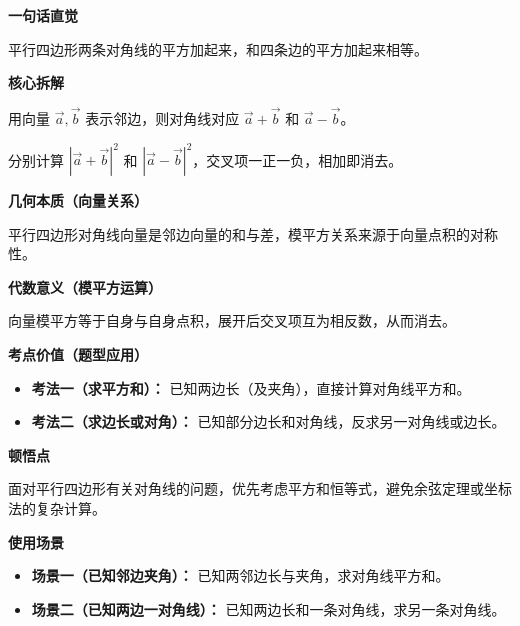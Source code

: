 \begin{explanationbox}
	\textbf{\textcolor{CExplanation}{一句话直觉}}

	平行四边形两条对角线的平方加起来，和四条边的平方加起来相等。

	\medskip
	\textbf{\textcolor{CExplanation}{核心拆解}}

	\begin{description}[style=nextline, leftmargin=2.8em, labelsep=0.5em, itemsep=0.45em]
		\item[\textbf{要点一（向量表示法）：}] 用向量 $\vec{a},\vec{b}$ 表示邻边，则对角线对应 $\vec{a}+\vec{b}$ 和 $\vec{a}-\vec{b}$。
		\item[\textbf{要点二（模平方展开）：}] 分别计算 $|\vec{a}+\vec{b}|^2$ 和 $|\vec{a}-\vec{b}|^2$，交叉项一正一负，相加即消去。
	\end{description}

	\medskip
	\textbf{\textcolor{CExplanation}{几何本质（向量关系）}}

	平行四边形对角线向量是邻边向量的和与差，模平方关系来源于向量点积的对称性。

	\medskip
	\textbf{\textcolor{CExplanation}{代数意义（模平方运算）}}

	向量模平方等于自身与自身点积，展开后交叉项互为相反数，从而消去。

	\medskip
	\textbf{\textcolor{CExplanation}{考点价值（题型应用）}}

	\begin{itemize}[leftmargin=*, itemsep=0.5em, topsep=0.4em]
		\item \textbf{考法一（求平方和）：} 已知两边长（及夹角），直接计算对角线平方和。
		\item \textbf{考法二（求边长或对角）：} 已知部分边长和对角线，反求另一对角线或边长。
	\end{itemize}

	\medskip
	\textbf{\textcolor{CExplanation}{顿悟点}}

	面对平行四边形有关对角线的问题，优先考虑平方和恒等式，避免余弦定理或坐标法的复杂计算。

	\medskip
	\textbf{\textcolor{CExplanation}{使用场景}}

	\begin{itemize}[leftmargin=*, itemsep=0.5em, topsep=0.4em]
		\item \textbf{场景一（已知邻边夹角）：} 已知两邻边长与夹角，求对角线平方和。
		\item \textbf{场景二（已知两边一对角线）：} 已知两边长和一条对角线，求另一条对角线。
	\end{itemize}
\end{explanationbox}
